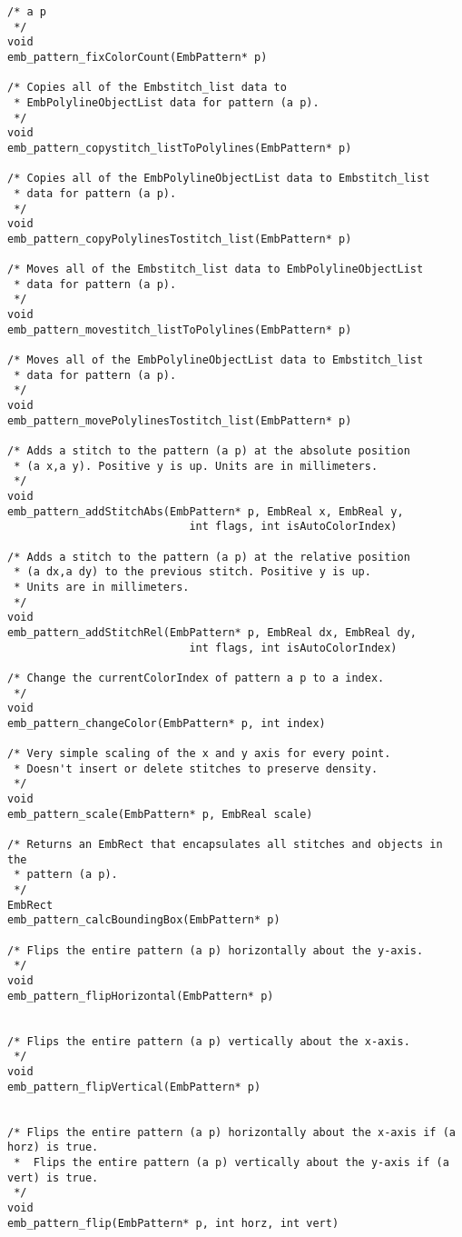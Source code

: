 \begin{lstlisting}
/* a p
 */
void
emb_pattern_fixColorCount(EmbPattern* p)

/* Copies all of the Embstitch_list data to
 * EmbPolylineObjectList data for pattern (a p).
 */
void
emb_pattern_copystitch_listToPolylines(EmbPattern* p)

/* Copies all of the EmbPolylineObjectList data to Embstitch_list
 * data for pattern (a p).
 */
void
emb_pattern_copyPolylinesTostitch_list(EmbPattern* p)

/* Moves all of the Embstitch_list data to EmbPolylineObjectList
 * data for pattern (a p).
 */
void
emb_pattern_movestitch_listToPolylines(EmbPattern* p)

/* Moves all of the EmbPolylineObjectList data to Embstitch_list
 * data for pattern (a p).
 */
void
emb_pattern_movePolylinesTostitch_list(EmbPattern* p)

/* Adds a stitch to the pattern (a p) at the absolute position
 * (a x,a y). Positive y is up. Units are in millimeters.
 */
void
emb_pattern_addStitchAbs(EmbPattern* p, EmbReal x, EmbReal y,
                            int flags, int isAutoColorIndex)

/* Adds a stitch to the pattern (a p) at the relative position
 * (a dx,a dy) to the previous stitch. Positive y is up.
 * Units are in millimeters.
 */
void
emb_pattern_addStitchRel(EmbPattern* p, EmbReal dx, EmbReal dy,
                            int flags, int isAutoColorIndex)

/* Change the currentColorIndex of pattern a p to a index.
 */
void
emb_pattern_changeColor(EmbPattern* p, int index)

/* Very simple scaling of the x and y axis for every point.
 * Doesn't insert or delete stitches to preserve density.
 */
void
emb_pattern_scale(EmbPattern* p, EmbReal scale)

/* Returns an EmbRect that encapsulates all stitches and objects in the
 * pattern (a p).
 */
EmbRect
emb_pattern_calcBoundingBox(EmbPattern* p)

/* Flips the entire pattern (a p) horizontally about the y-axis.
 */
void
emb_pattern_flipHorizontal(EmbPattern* p)


/* Flips the entire pattern (a p) vertically about the x-axis.
 */
void
emb_pattern_flipVertical(EmbPattern* p)


/* Flips the entire pattern (a p) horizontally about the x-axis if (a horz) is true.
 *  Flips the entire pattern (a p) vertically about the y-axis if (a vert) is true.
 */
void
emb_pattern_flip(EmbPattern* p, int horz, int vert)


\end{lstlisting}
